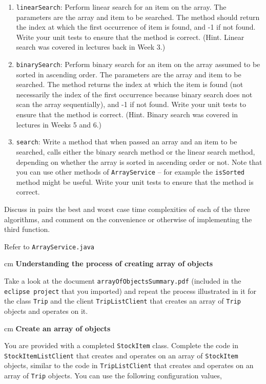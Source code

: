 \begin{questions}
\begin{enumerate}
\item \texttt{linearSearch}: Perform linear search for an item on the array. The parameters are the array and item to be searched. The method should return the index at which the first occurrence of item is found, and -1 if not found. Write your unit tests to ensure that the method is correct. (Hint. Linear search was covered in lectures back in Week 3.)
\item \texttt{binarySearch}: Perform binary search for an item on the array assumed to be sorted in ascending order.  The parameters are the array and item to be searched.  The method returns the index at which the item is found (not necessarily the index of the first occurrence because binary search does not scan the array sequentially), and -1 if not found. Write your unit tests to ensure that the method is correct. (Hint. Binary search was covered in lectures in Weeks 5 and 6.)
\item \texttt{search}: Write a method that when passed an array and an item to be searched, calls either the binary search method or the linear search method, depending on whether the array is sorted in ascending order or not. Note that you can use other methods of \texttt{ArrayService} -- for example the \texttt{isSorted} method might be useful. Write your unit tests to ensure that the method is correct. 
\end{enumerate}

Discuss in pairs the best and worst case time complexities of each of the three algorithms, and comment on the convenience or otherwise of implementing the third function.

\begin{solution}
Refer to \texttt{ArrayService.java}
\end{solution}


 cm \question \textbf{Understanding the process of creating array of objects} \vskip 0.5cm

Take a look at the document \texttt{arrayOfObjectsSummary.pdf} (included in the \texttt{eclipse project} that you imported) and repeat the process illustrated in it for the class \texttt{Trip} and the client \texttt{TripListClient} that creates an array of \texttt{Trip} objects and operates on it.

 cm \question \textbf{Create an array of objects} \vskip 0.5cm

You are provided with a completed \texttt{StockItem} class. Complete the code in \texttt{StockItemListClient} that creates and operates on an array of \texttt{StockItem} objects, similar to the code in \texttt{TripListClient} that creates and operates on an array of \texttt{Trip} objects. You can use the following configuration values,


\end{questions}
